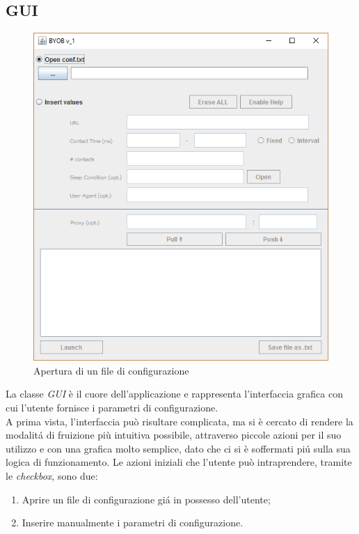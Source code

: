 \vspace*{0.5cm}
\subsection{GUI}
\begin{figure}[!htb]
        \centering
		\includegraphics[width=0.7\linewidth]{./imgs/gui}
        \caption{Apertura di un file di configurazione}
        \label{apertura}
        \vspace*{0.5cm}
\end{figure}

La classe \textit{GUI} \`e il cuore dell'applicazione e rappresenta l'interfaccia grafica con cui l'utente fornisce i parametri di configurazione.\\
A prima vista, l'interfaccia pu\`o risultare complicata, ma si \`e cercato di rendere la modalit\'a di fruizione pi\`u intuitiva possibile, attraverso piccole azioni per il suo utilizzo e con una grafica molto semplice, dato che ci si \`e soffermati pi\'u sulla sua logica di funzionamento.
Le azioni iniziali che l'utente pu\`o intraprendere, tramite le \textit{checkbox}, sono due:
\begin{enumerate}
\item Aprire un file di configurazione gi\'a in possesso dell'utente;
\item Inserire manualmente i parametri di configurazione.
\end{enumerate}

